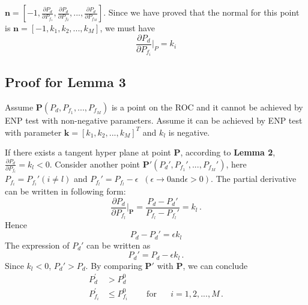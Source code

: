 \documentclass[12pt,journal,a4paper,twoside,onecolumn]{IEEEtran}
\begin{document}
\begin{spacing}{2.5}
 $\mathbf{n} = [-1, \frac{\partial P_d}{\partial P_{f_1}}, \frac{\partial P_d}{\partial P_{f_2}}, ..., \frac{\partial P_d}{\partial P_{f_M}}]$. Since we have proved that  the normal for this point is $\mathbf{n} = [-1, k_1, k_2, ..., k_M]$, we must have
\begin{equation}
\frac{\partial P_d}{\partial P_{f_i}}\bigg|_{P} = k_i
\end{equation}


\subsection{Proof for Lemma 3}
Assume $\mathbf{P} (P_d, P_{f_1}, ..., P_{f_M})$ is a point on the ROC and it cannot be achieved by ENP test with non-negative parameters. Assume it can be achieved by ENP test with parameter $\mathbf{k} = [k_1, k_2, ..., k_M]^T$ and $k_l$ is negative.

 If there exists a tangent hyper plane at point $\mathbf{P}$, according to \textbf{Lemma 2}, $\frac{\partial P_d}{\partial P_{f_l}} = k_l < 0$. Consider another point $\mathbf{P}' (P_d', P_{f_1}', ..., P_{f_M}')$, here $P_{f_i} = P_{f_i}' (i \neq l)$ and $P_{f_l}' = P_{f_l} - \epsilon \;\;(\epsilon \rightarrow 0 \text{and} \epsilon >0)$. The partial derivative can be written in following form:
 \begin{equation}
   \frac{\partial P_d}{ \partial P_{f_l}} \bigg|_{\mathbf{P}} = \frac{P_d - P_d'}{P_{f_l} - P_{f_l}'} = k_l\,.
 \end{equation}
 Hence
 \begin{equation}
   P_d - P_d' = \epsilon k_l
 \end{equation}
 The expression of $P_d'$ can be written as
 \begin{equation}
   P_d'= P_d - \epsilon k_l\,.
 \end{equation}
Since $k_l < 0$, $P_d' > P_d$. By comparing $\mathbf{P}'$ with $\mathbf{P}$, we can conclude
\begin{equation}
\begin{split}
  P_{d}^\prime &> P_{d}^0\\
  P_{f_i}^\prime &\leq P_{f_i}^0 \;\;\;\;\;\;\;\;\text{for}\;\;\;\;\;\; i=1, 2, ..., M\,.
\end{split}
\end{equation}


\end{spacing}
\end{document}
